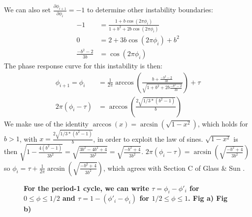 \noindent We can also set $\frac{\partial \phi_{i+1}}{\partial \phi_i} = -1$ to determine other instability boundaries:
\begin{align}
    -1 &= \frac{1+b\cos(2\pi \phi_i)}{1 + b^2 + 2b\cos(2\pi \phi_i)} \nonumber \\
    0 &= 2+3b\cos(2\pi \phi_i) + b^2 \nonumber \\
    \frac{-b^2-2}{3b} &= \cos(2\pi \phi_i)
    \label{eq:square} 
\end{align}
The phase response curve for this instability is then:
\begin{align}
    \phi_{i+1} = \phi_i &= \frac{1}{2\pi}\arccos(\frac{b+\frac{-b^2-2}{3b}}{\sqrt{1+b^2+2b\frac{-b^2-2}{3b}}}) + \tau \nonumber \\
    2\pi(\phi_i - \tau) &= \arccos(\frac{2\sqrt{1/3*(b^2-1)}}{b})
\end{align} 
We make use of the identity $\arccos(x) = \arcsin(\sqrt{1-x^2})$, which holds for $b>1$, with $x = \frac{2\sqrt{1/3*(b^2-1)}}{b}$, in order to exploit the law of sines. $\sqrt{1-x^2}$ is then $\sqrt{1-\frac{4(b^2-1)}{3b^2}} = \sqrt{\frac{3b^2-4b^2+4}{3b^2}} = \sqrt{\frac{-b^2+4}{3b^2}}$. $2\pi(\phi_i - \tau) = \arcsin(\sqrt{\frac{-b^2+4}{3b^2}})$ so $\phi_i = \tau +\frac{1}{2\pi}\arcsin(\sqrt{\frac{-b^2+4}{3b^2}})$, which agrees with Section C of Glass \& Sun \supercite{GLASS1994}.

\begin{figure}[tbph]
    \medskip
    \caption{\textbf{For the period-1 cycle, we can write $\tau = \phi_i - \phi'_i$ for $0\leq \phi \leq1/2$ and $\tau = 1-(\phi'_i - \phi_i)$ for $1/2\leq \phi \leq1$. Fig a) Fig b)}}
    \label{sines}
\end{figure}

